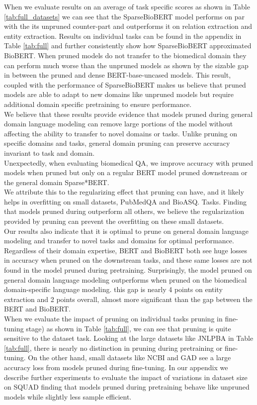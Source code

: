When we evaluate results on an average of task specific scores as shown in Table \ref{tab:full_datasets} we can see that the SparseBioBERT model performs on par with the its unpruned counter-part and outperforms it on relation extraction and entity extraction. Results on individual tasks can be found in the appendix in Table \ref{tab:full} and further consistently show how SparseBioBERT approximated BioBERT. When pruned models do not transfer to the biomedical domain they can perform much worse than the unpruned models as shown by the sizable gap in between the pruned and dense BERT-base-uncased models. This result, coupled with the performance of SparseBioBERT makes us believe that pruned models are able to adapt to new domains like unpruned models but require additional domain specific pretraining to ensure performance. \\
We believe that these results provide evidence that models pruned during general domain language modeling can remove large portions of the model without affecting the ability to transfer to novel domains or tasks. Unlike pruning on specific domains and tasks, general domain pruning can preserve accuracy invariant to task and domain. \\
Unexpectedly, when evaluating biomedical QA, we improve accuracy with pruned models when pruned but only on a regular BERT model pruned downstream or the general domain Sparse*BERT. \\ We attribute this to the regularizing effect that pruning can have, and it likely helps in overfitting on small datasets, PubMedQA and BioASQ. Tasks. Finding that models pruned during outperform all others, we believe the regularization provided by pruning can prevent the overfitting on these small datasets.  \\
Our results also indicate that it is optimal to prune on general domain language modeling and transfer to novel tasks and domains for optimal performance. Regardless of their domain expertise, BERT and BioBERT both see huge losses in accuracy when pruned on the downstream tasks, and these same losses are not found in the model pruned during pretraining. Surprisingly, the model pruned on general domain language modeling outperforms when pruned on the biomedical domain-specific language modeling. this gap is nearly 4 points on entity extraction and 2 points overall, almost more significant than the gap between the BERT and BioBERT. \\
When we evaluate the impact of pruning on individual tasks pruning in fine-tuning stage) as shown in Table \ref{tab:full}, we can see that pruning is quite sensitive to the dataset task. Looking at the large datasets like JNLPBA in Table \ref{tab:full}, there is nearly no distinction in pruning during pretraining or fine-tuning. On the other hand, small datasets like NCBI and GAD see a large accuracy loss from models pruned during fine-tuning. In our appendix we describe further experiments to evaluate the impact of variations in dataset size on SQUAD \cite{Rajpurkar2016SQuAD1Q} finding that models pruned during pretraining behave like unpruned models while slightly less sample efficient.

